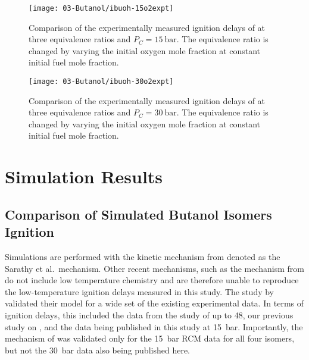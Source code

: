 \documentclass[../main.tex]{subfiles}
\begin{document}
\begin{figure}
    \begin{floatrow}
    \ffigbox
        {\texttt{[image: 03-Butanol/ibuoh-15o2expt]}}
        {\caption{Comparison of the experimentally measured ignition
        delays of \iBuOH{} at three equivalence ratios and $P_C=\SI{15}{\bar}$.
        The equivalence ratio is changed by varying the initial oxygen
        mole fraction at constant initial fuel mole fraction.}
        \label{fig:ibuoh-15o2expt}}
    \ffigbox
        {\texttt{[image: 03-Butanol/ibuoh-30o2expt]}}
        {\caption{Comparison of the experimentally measured ignition
        delays of \iBuOH{} at three equivalence ratios and $P_C=\SI{30}{\bar}$.
        The equivalence ratio is changed by varying the initial oxygen
        mole fraction at constant initial fuel mole fraction.}
        \label{fig:ibuoh-30o2expt}}
    \end{floatrow}
\end{figure}

\section{Simulation Results}
\subsection{Comparison of Simulated Butanol Isomers Ignition}
\label{sec:buoh-sims}

Simulations are performed with the kinetic mechanism from
\textcite{Sarathy2012} denoted as the Sarathy et al.\ mechanism.
Other recent mechanisms, such as the mechanism from
\textcite{Frassoldati2012} do not include low temperature chemistry and are
therefore unable to reproduce the low-temperature ignition delays measured in
this study. The study by \textcite{Sarathy2012} validated their model for a
wide set of the existing experimental data. In terms of ignition delays, this
included the data from the study of \textcite{Stranic2012} up to \SI{48}{\atmosphere}, our
previous study on \nBuOH{} \cite{Weber2011}, and the data being
published in this study at \SI{15}{\bar}. Importantly, the mechanism of
\textcite{Sarathy2012} was validated only for the \SI{15}{\bar} RCM data for all four
isomers, but not the \SI{30}{\bar} data also being published here.
\end{document}

